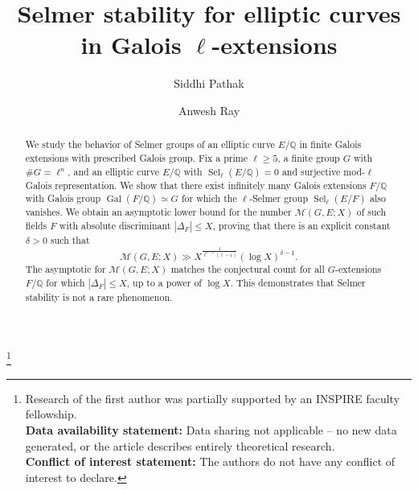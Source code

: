 \documentclass[11pt,reqno]{amsart}
\newcommand{\Q}{\mathbb{Q}}
\numberwithin{equation}{section}
\begin{document}
\title[Selmer stability for elliptic curves]{Selmer stability for elliptic curves in Galois $\ell$-extensions}




\author[S.~Pathak]{Siddhi Pathak}
\address[Pathak]{Chennai Mathematical Institute, H1, SIPCOT IT Park, Kelambakkam, Siruseri, Tamil Nadu 603103, India}


\author[A.~Ray]{Anwesh Ray}
\address[Ray]{Chennai Mathematical Institute, H1, SIPCOT IT Park, Kelambakkam, Siruseri, Tamil Nadu 603103, India}



\thanks{Research of the first author was partially supported by an INSPIRE faculty fellowship. \\
\textbf{Data availability statement:} Data sharing not applicable – no new data generated, or the article describes entirely theoretical research. \\
\textbf{Conflict of interest statement:} The authors do not have any conflict of interest to declare.}


\begin{abstract}
We study the behavior of Selmer groups of an elliptic curve \( E/\Q \) in finite Galois extensions with prescribed Galois group. Fix a prime \( \ell \geq 5 \), a finite group \( G \) with $\#G = \ell^n$, and an elliptic curve \( E/\Q \) with \( \operatorname{Sel}_\ell(E/\Q) = 0 \) and surjective mod-\( \ell \) Galois representation. We show that there exist infinitely many Galois extensions \( F/\Q \) with Galois group \( \operatorname{Gal}(F/\Q) \simeq G \) for which the \( \ell \)-Selmer group \( \operatorname{Sel}_\ell(E/F) \) also vanishes. We obtain an asymptotic lower bound for the number \( \mathcal{M}(G, E; X) \) of such fields $F$ with absolute discriminant \( |\Delta_F|\leq X \), proving that there is an explicit constant $\delta>0$ such that
\[
\mathcal{M}(G, E; X) \gg X^{\frac{1}{\ell^{n-1}(\ell - 1)}} (\log X)^{\delta - 1}.
\]
 The asymptotic for $\mathcal{M}(G, E; X)$ matches the conjectural count for all $G$-extensions $F/\Q$ for which $|\Delta_F|\leq X$, up to a power of $\log X$. This demonstrates that Selmer stability is not a rare phenomenon.
\end{abstract}
\end{document}
